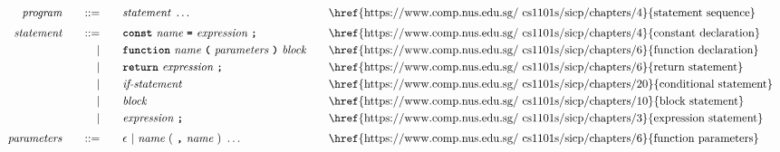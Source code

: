 \begin{alignat*}{9}
&& \textit{program}    &&\quad ::= &\quad && \textit{statement} \ \ldots
                                                           && \textrm{\href{https://www.comp.nus.edu.sg/~cs1101s/sicp/chapters/4}{statement sequence}} \\[1mm]
&& \textit{statement}    &&\quad ::= &\quad && \textbf{\texttt{const}}\  \textit{name} \ 
                                           \textbf{\texttt{=}}\  \textit{expression} \ \textbf{\texttt{;}}
                                                           && \textrm{\href{https://www.comp.nus.edu.sg/~cs1101s/sicp/chapters/4}{constant declaration}} \\
&&                       && |   &\quad && \textbf{\texttt{function}}\  \textit{name} \ 
                                   \textbf{\texttt{(}}\  \textit{parameters} \ \textbf{\texttt{)}}\ \textit{block} \quad
                                                           && \textrm{\href{https://www.comp.nus.edu.sg/~cs1101s/sicp/chapters/6}{function declaration}}\\
&&                       && |   &\quad && \textbf{\texttt{return}}\  \textit{expression} \ \textbf{\texttt{;}}
                                                           && \textrm{\href{https://www.comp.nus.edu.sg/~cs1101s/sicp/chapters/6}{return statement}}\\
&&                       && |   &\quad && \textit{if-statement} \quad
                                                           && \textrm{\href{https://www.comp.nus.edu.sg/~cs1101s/sicp/chapters/20}{conditional statement}}\\
&&                       && |   &\quad &&  \textit{block} 
                                                           && \textrm{\href{https://www.comp.nus.edu.sg/~cs1101s/sicp/chapters/10}{block statement}}\\
&&                       && |   &\quad &&  \textit{expression} \ \textbf{\texttt{;}}
                                                           && \textrm{\href{https://www.comp.nus.edu.sg/~cs1101s/sicp/chapters/3}{expression statement}} \\[1mm]
&& \textit{parameters}   && ::= &\quad &&  \epsilon\ | \  \textit{name} \ 
                                                   (\ \textbf{\texttt{,}} \ \textit{name}\ )\ \ldots
                                                            && \textrm{\href{https://www.comp.nus.edu.sg/~cs1101s/sicp/chapters/6}{function parameters}}   \\[1mm]

\end{alignat*}
